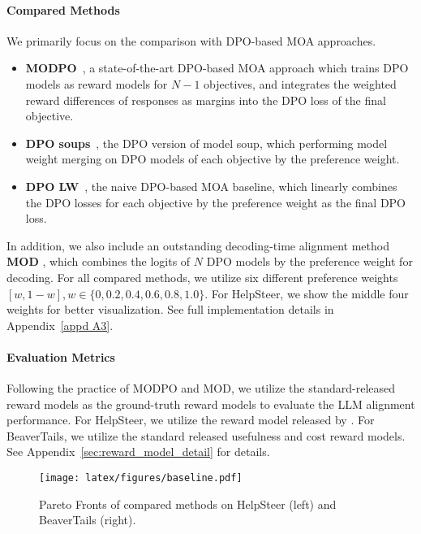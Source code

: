 \paragraph{Compared Methods}
We primarily focus on the comparison with DPO-based MOA approaches.
\begin{itemize}
 \setlength\itemsep{-0.3em}
    \item \textbf{MODPO}~\cite{DBLP:conf/acl/ZhouLS00O024}, a state-of-the-art DPO-based MOA approach which trains DPO models as reward models for $N-1$ objectives, and integrates the weighted reward differences of responses as margins into the DPO loss of the final objective. 
    \item \textbf{DPO soups}~\cite{DBLP:conf/nips/RameCDGSSC23}, the DPO version of model soup, which performing model weight merging on DPO models of each objective by the preference weight.
    \item \textbf{DPO LW}~\cite{DBLP:conf/acl/ZhouLS00O024}, the naive DPO-based MOA baseline, which linearly combines the DPO losses for each objective by the preference weight as the final DPO loss. 
\end{itemize}
In addition, we also include an outstanding decoding-time alignment method \textbf{MOD} \cite{DBLP:conf/nips/ShiCHLHSD24}, which combines the logits of $N$ DPO models by the preference weight for decoding. 
For all compared methods, we utilize six different preference weights $[w, 1-w], w \in \{0, 0.2, 0.4, 0.6, 0.8, 1.0\}$. For HelpSteer, we show the middle four weights for better visualization. 
See full implementation details in Appendix~\ref{appd A3}.  


\paragraph{Evaluation Metrics}
Following the practice of MODPO and MOD, we utilize the standard-released reward models as the ground-truth reward models to evaluate the LLM alignment performance. 
For HelpSteer, we utilize the reward model released by \citet{DBLP:conf/acl/WangLXYDQZZ24}. 
For BeaverTails, we utilize the standard released usefulness and cost reward models. See Appendix~\ref{sec:reward_model_detail} for details. 


\begin{figure}[t]
 \setlength{\abovecaptionskip}{0.05cm}
 \setlength{\belowcaptionskip}{0cm}
    \centering
    \texttt{[image: latex/figures/baseline.pdf]}
    \caption{Pareto Fronts of compared methods on HelpSteer (left) and BeaverTails (right).}
    \label{fig:main_result}
\end{figure}

